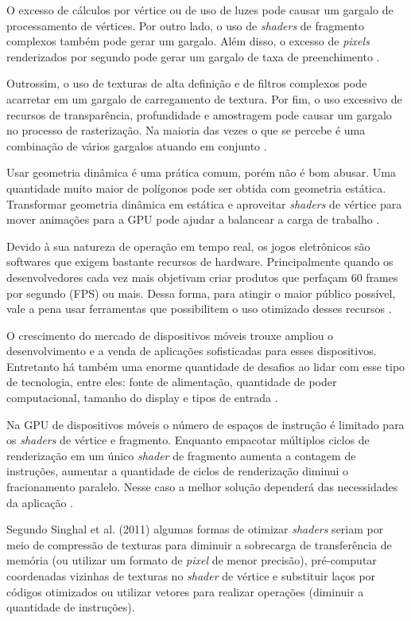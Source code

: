 O excesso de cálculos por vértice ou de uso de luzes pode causar um gargalo de processamento de vértices. Por outro lado, o uso de \textit{shaders} de fragmento complexos também pode gerar um gargalo. Além disso, o excesso de \textit{pixels} renderizados por segundo pode gerar um gargalo de taxa de preenchimento \cite{riguer2002performance}.

Outrossim, o uso de texturas de alta definição e de filtros complexos pode acarretar em um gargalo de carregamento de textura. Por fim, o uso excessivo de recursos de transparência, profundidade e amostragem pode causar um gargalo no processo de rasterização. Na maioria das vezes o que se percebe é uma combinação de vários gargalos atuando em conjunto \cite{riguer2002performance}. 

Usar geometria dinâmica é uma prática comum, porém não é bom abusar. Uma quantidade muito maior de polígonos pode ser obtida com geometria estática. Transformar geometria dinâmica em estática e aproveitar \textit{shaders} de vértice para mover animações para a GPU pode ajudar a balancear a carga de trabalho \cite{riguer2002performance}. 

Devido à sua natureza de operação em tempo real, os jogos eletrônicos são softwares que exigem bastante recursos de hardware. Principalmente quando os desenvolvedores cada vez mais objetivam criar produtos que perfaçam 60 frames por segundo (FPS) ou mais. Dessa forma, para atingir o maior público possível, vale a pena usar ferramentas que possibilitem o uso otimizado desses recursos \cite{comparacaoDesempenho}.

O crescimento do mercado de dispositivos móveis trouxe ampliou o desenvolvimento e a venda de aplicações sofisticadas para esses dispositivos. Entretanto há também uma enorme quantidade de desafios ao lidar com esse tipo de tecnologia, entre eles: fonte de alimentação, quantidade de poder computacional, tamanho do display e tipos de entrada \cite{optimizationMobile}.

Na GPU de dispositivos móveis o número de espaços de instrução é limitado para os \textit{shaders} de vértice e fragmento. Enquanto empacotar múltiplos ciclos de renderização em um único \textit{shader} de fragmento aumenta a contagem de instruções, aumentar a quantidade de ciclos de renderização diminui o fracionamento paralelo. Nesse caso a melhor solução dependerá das necessidades da aplicação \cite{designMobileGPU}. 

Segundo Singhal et al. (2011) algumas formas de otimizar \textit{shaders} seriam por meio de compressão de texturas para diminuir a sobrecarga de transferência de memória (ou utilizar um formato de \textit{pixel} de menor precisão), pré-computar coordenadas vizinhas de texturas no \textit{shader} de vértice e substituir laços por códigos otimizados ou utilizar vetores para realizar operações (diminuir a quantidade de instruções).

